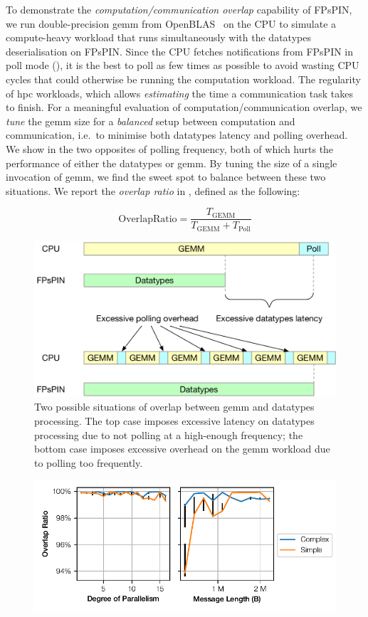 To demonstrate the \emph{computation/communication overlap} capability of FPsPIN, we run double-precision \ac{gemm} from OpenBLAS~\cite{xianyi_model-driven_2012} on the CPU to simulate a compute-heavy workload that runs simultaneously with the datatypes deserialisation on FPsPIN.  Since the CPU fetches notifications from FPsPIN in poll mode (), it is the best to poll as few times as possible to avoid wasting CPU cycles that could otherwise be running the computation workload.  The regularity of \ac{hpc} workloads, which allows \emph{estimating} the time a communication task takes to finish.  For a meaningful evaluation of computation/communication overlap, we \emph{tune} the \ac{gemm} size for a \emph{balanced} setup between computation and communication, i.e.\ to minimise both datatypes latency and polling overhead.  We show in  the two opposites of polling frequency, both of which hurts the performance of either the datatypes or \ac{gemm}.  By tuning the size of a single invocation of \ac{gemm}, we find the sweet spot to balance between these two situations.  We report the \emph{overlap ratio} in , defined as the following:

\[
\text{OverlapRatio} = \frac{T_{\text{GEMM}}}{T_{\text{GEMM}} + T_{\text{Poll}}}
\]

\begin{figure}[tp]
    \centering
    \includegraphics[width=.8\textwidth]{thesis/figures/datatypes-tune-goal.pdf}
    \caption{Two possible situations of overlap between \ac{gemm} and datatypes processing.  The top case imposes excessive latency on datatypes processing due to not polling at a high-enough frequency; the bottom case imposes excessive overhead on the \ac{gemm} workload due to polling too frequently.} \label{fig:datatypes-tuning-goal}
\end{figure}

\begin{figure}[tp]
    \centering
    \includegraphics{thesis/figures/datatypes-overlap.pdf}
    \caption{} \label{fig:datatypes-overlap}
\end{figure}

